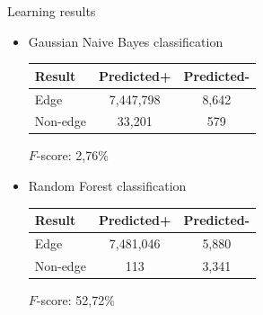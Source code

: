 \documentclass[final]{beamer}
\newlength{\onecolwid}
\newlength{\twocolwid}
\begin{document}
\begin{frame}[t]
\begin{columns}[t]
\begin{column}{\twocolwid}
\begin{columns}[t,totalwidth=\twocolwid]
\begin{column}{\onecolwid}
\end{column} %

\begin{column}{\onecolwid} %


\begin{block}{Learning results}

  \begin{itemize}
    \item Gaussian Naive Bayes classification
    \begin{center}
    \begin{tabular}{|l||c|c|}
        \hline
        Result  & Predicted+ & Predicted- \\
        \hline
        Edge & 7,447,798 & 8,642 \\
        Non-edge & 33,201 & 579 \\
        \hline
    \end{tabular}
    \end{center}

      $F$-score: 2,76\%
    \item Random Forest classification
    \begin{center}
    \begin{tabular}{|l||c|c|}
        \hline
        Result  & Predicted+ & Predicted- \\
        \hline
        Edge & 7,481,046 & 5,880 \\
        Non-edge & 113 & 3,341 \\
        \hline
    \end{tabular}
    \end{center}
      $F$-score: 52,72\%
  \end{itemize}

\end{block}


\end{column} %

\end{columns} %

\end{column} %


\end{columns}
\end{frame}
\end{document}
